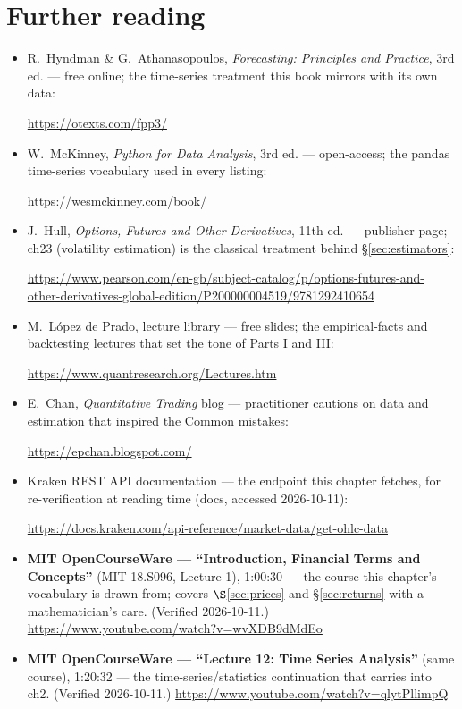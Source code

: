 \section*{Further reading}
\begin{itemize}
\item R.~Hyndman \& G.~Athanasopoulos, \emph{Forecasting: Principles
and Practice}, 3rd ed. --- free online; the time-series treatment
this book mirrors with its own data:

\url{https://otexts.com/fpp3/}
\item W.~McKinney, \emph{Python for Data Analysis}, 3rd ed. ---
open-access; the pandas time-series vocabulary used in every
listing:

\url{https://wesmckinney.com/book/}
\item J.~Hull, \emph{Options, Futures and Other Derivatives}, 11th
ed. --- publisher page; ch23 (volatility estimation) is the
classical treatment behind \S\ref{sec:estimators}:

\url{https://www.pearson.com/en-gb/subject-catalog/p/options-futures-and-other-derivatives-global-edition/P200000004519/9781292410654}
\item M.~L\'opez de Prado, lecture library --- free slides; the
empirical-facts and backtesting lectures that set the tone of Parts
I and III:

\url{https://www.quantresearch.org/Lectures.htm}
\item E.~Chan, \emph{Quantitative Trading} blog --- practitioner
cautions on data and estimation that inspired the Common mistakes:

\url{https://epchan.blogspot.com/}
\item Kraken REST API documentation --- the endpoint this chapter
fetches, for re-verification at reading time (docs, accessed
2026-10-11):

\url{https://docs.kraken.com/api-reference/market-data/get-ohlc-data}
\end{itemize}

\begin{rulebox}
\begin{itemize}
\item \textbf{MIT OpenCourseWare --- ``Introduction, Financial Terms
and Concepts''} (MIT 18.S096, Lecture 1), 1:00:30 --- the course this
chapter's vocabulary is drawn from; covers $\S$\ref{sec:prices} and
\S\ref{sec:returns} with a mathematician's care. (Verified
2026-10-11.)
\url{https://www.youtube.com/watch?v=wvXDB9dMdEo}
\item \textbf{MIT OpenCourseWare --- ``Lecture 12: Time Series
Analysis''} (same course), 1:20:32 --- the time-series/statistics
continuation that carries into ch2. (Verified 2026-10-11.)
\url{https://www.youtube.com/watch?v=qlytPllimpQ}
\end{itemize}
\end{rulebox}
